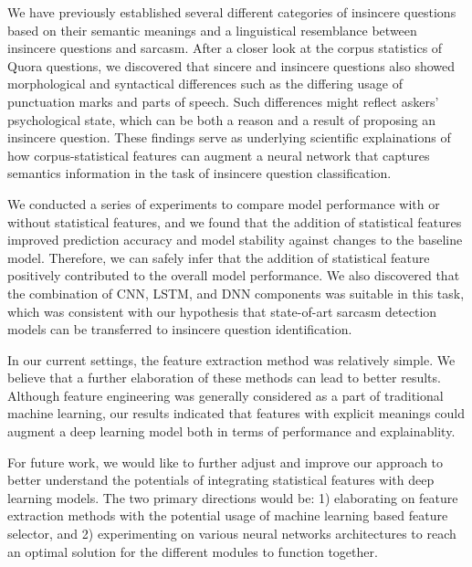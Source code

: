 \documentclass[12pt]{diazessay} %
\begin{document}
{We have previously established several different categories of insincere questions based on their semantic meanings and a linguistical resemblance between insincere questions and sarcasm. After a closer look at the corpus statistics of Quora questions, we discovered that sincere and insincere questions also showed morphological and syntactical differences such as the differing usage of punctuation marks and parts of speech. Such differences might reflect askers' psychological state, which can be both a reason and a result of proposing an insincere question. These findings serve as underlying scientific explainations of how corpus-statistical features can augment a neural network that captures semantics information in the task of insincere question classification. 

We conducted a series of experiments to compare model performance with or without statistical features, and we found that the addition of statistical features improved prediction accuracy and model stability against changes to the baseline model. Therefore, we can safely infer that the addition of statistical feature positively contributed to the overall model performance. We also discovered that the combination of CNN, LSTM, and DNN components was suitable in this task, which was consistent with our hypothesis that state-of-art sarcasm detection models can be transferred to insincere question identification. 

In our current settings, the feature extraction method was relatively simple. We believe that a further elaboration of these methods can lead to better results. Although feature engineering was generally considered as a part of traditional machine learning, our results indicated that features with explicit meanings could augment a deep learning model both in terms of performance and explainablity. 

For future work, we would like to further adjust and improve our approach to better understand the potentials of integrating statistical features with deep learning models. The two primary directions would be: 1) elaborating on feature extraction methods with the potential usage of machine learning based feature selector, and 2) experimenting on various neural networks architectures to reach an optimal solution for the different modules to function together. 

}
\end{document}
